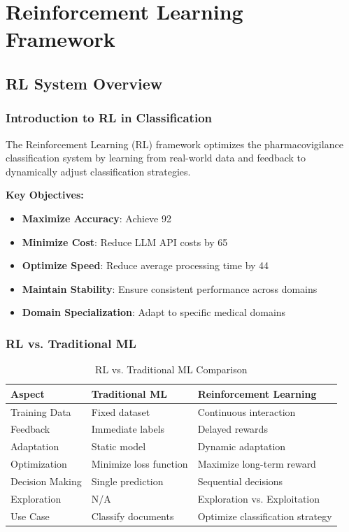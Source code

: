 
\chapter{Reinforcement Learning Framework}

\section{RL System Overview}

\subsection{Introduction to RL in Classification}

The Reinforcement Learning (RL) framework optimizes the pharmacovigilance classification system by learning from real-world data and feedback to dynamically adjust classification strategies.

\textbf{Key Objectives:}
\begin{itemize}
    \item \textbf{Maximize Accuracy}: Achieve 92%
    \item \textbf{Minimize Cost}: Reduce LLM API costs by 65%
    \item \textbf{Optimize Speed}: Reduce average processing time by 44%
    \item \textbf{Maintain Stability}: Ensure consistent performance across domains
    \item \textbf{Domain Specialization}: Adapt to specific medical domains
\end{itemize}

\subsection{RL vs. Traditional ML}

\begin{table}[h]
\centering
\caption{RL vs. Traditional ML Comparison}
\begin{tabularx}{\textwidth}{lXX}
\toprule
\textbf{Aspect} & \textbf{Traditional ML} & \textbf{Reinforcement Learning} \\
\midrule
Training Data & Fixed dataset & Continuous interaction \\
Feedback & Immediate labels & Delayed rewards \\
Adaptation & Static model & Dynamic adaptation \\
Optimization & Minimize loss function & Maximize long-term reward \\
Decision Making & Single prediction & Sequential decisions \\
Exploration & N/A & Exploration vs. Exploitation \\
Use Case & Classify documents & Optimize classification strategy \\
\bottomrule
\end{tabularx}
\end{table}

